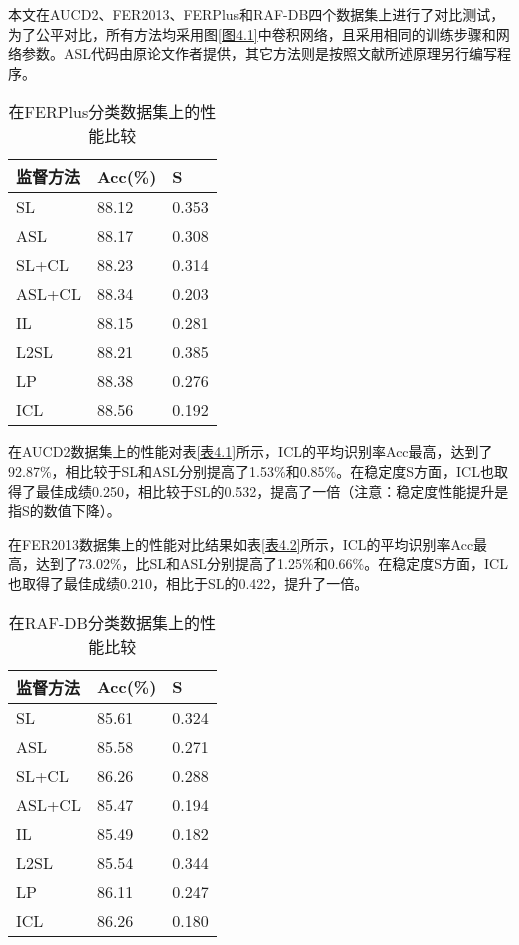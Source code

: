 本文在AUCD2、FER2013、FERPlus和RAF-DB四个数据集上进行了对比测试，为了公平对比，所有方法均采用图\ref{图4.1}中卷积网络，且采用相同的训练步骤和网络参数。ASL代码由原论文作者提供，其它方法则是按照文献所述原理另行编写程序。

\begin{table}[!ht]
	\caption{在FERPlus分类数据集上的性能比较}
	\label{表4.3}
	\renewcommand{\arraystretch}{1.5}
	\centering
	\begin{tabular}{p{3.5cm}<{\centering}p{3.5cm}<{\centering}p{3.5cm}<{\centering}}
		\bottomrule
		监督方法   & Acc(\%) & S     \\ 
		\hline
		SL     & 88.12   & 0.353 \\
		ASL    & 88.17   & 0.308 \\
		SL+CL  & 88.23   & 0.314 \\
		ASL+CL & 88.34   & 0.203 \\
		IL     & 88.15   & 0.281 \\
		L2SL   & 88.21   & 0.385 \\
		LP     & 88.38   & 0.276 \\
		ICL    & 88.56   & 0.192 \\ 
		\bottomrule
	\end{tabular}
\end{table}


在AUCD2数据集上的性能对表\ref{表4.1}所示，ICL的平均识别率Acc最高，达到了92.87\%，相比较于SL和ASL分别提高了1.53\%和0.85\%。在稳定度S方面，ICL也取得了最佳成绩0.250，相比较于SL的0.532，提高了一倍（注意：稳定度性能提升是指S的数值下降）。


在FER2013数据集上的性能对比结果如表\ref{表4.2}所示，ICL的平均识别率Acc最高，达到了73.02\%，比SL和ASL分别提高了1.25\%和0.66\%。在稳定度S方面，ICL也取得了最佳成绩0.210，相比于SL的0.422，提升了一倍。


\begin{table}[!ht]
	\caption{在RAF-DB分类数据集上的性能比较}
	\label{表4.4}
	\renewcommand{\arraystretch}{1.5}
	\centering
	\begin{tabular}{p{3.5cm}<{\centering}p{3.5cm}<{\centering}p{3.5cm}<{\centering}}
		\bottomrule
		监督方法   & Acc(\%) & S     \\ \hline
		SL     & 85.61   & 0.324 \\
		ASL    & 85.58   & 0.271 \\
		SL+CL  & 86.26   & 0.288 \\
		ASL+CL & 85.47   & 0.194 \\
		IL     & 85.49   & 0.182 \\
		L2SL   & 85.54   & 0.344 \\
		LP     & 86.11   & 0.247 \\
		ICL    & 86.26   & 0.180 \\ \bottomrule
	\end{tabular}
\end{table}


